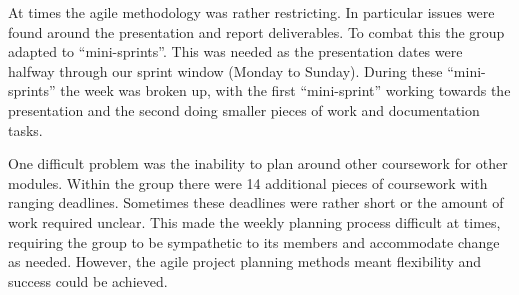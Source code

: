 At times the agile methodology was rather restricting. In particular issues were found around the presentation and report deliverables. To combat this the group adapted to ``mini-sprints''. This was needed as the presentation dates were halfway through our sprint window (Monday to Sunday). During these ``mini-sprints'' the week was broken up, with the first ``mini-sprint'' working towards the presentation and the second doing smaller pieces of work and documentation tasks.

One difficult problem was the inability to plan around other coursework for other modules. Within the group there were 14 additional pieces of coursework with ranging deadlines. Sometimes these deadlines were rather short or the amount of work required unclear. This made the weekly planning process difficult at times, requiring the group to be sympathetic to its members and accommodate change as needed. However, the agile project planning methods meant flexibility and success could be achieved.
